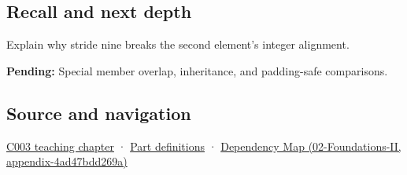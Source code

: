 \subsection{Recall and next depth}\label{recall-and-next-depth}

Explain why stride nine breaks the second element's integer alignment.

\textbf{Pending:} Special member overlap, inheritance, and padding-safe comparisons.

\subsection{Source and navigation}\label{source-and-navigation}

\href{Continuous\%20Notes/Computing\%20Foundations\%20-\%20From\%20Bits\%20to\%20C++\%20and\%20Systems\%20APIs\#Where\%20the\%20bytes\%20live}{C003 teaching chapter} · \hyperref[appendix-fd090d982a15]{Part definitions} · \href{}{Dependency Map (02-Foundations-II, appendix-4ad47bdd269a)}
